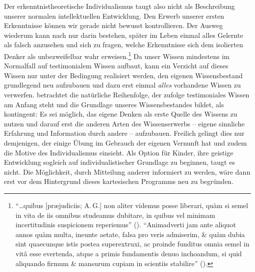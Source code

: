 Der erkenntnistheoretische Individualismus taugt also nicht als Beschreibung
unserer normalen intellektuellen Entwicklung. Den Erwerb unserer ersten
Erkenntnisse können wir gerade nicht bewusst kontrollieren. Der Ausweg wiederum
kann nach  nur darin bestehen, später im Leben einmal alles
Gelernte als falsch anzusehen und sich zu fragen, welche Erkenntnisse sich dem
isolierten Denker als unbezweifelbar wahr
erweisen.\footnote{\enquote{\dots\unkern quibus [pr{\ae}judiciis; A.\,G.] non
aliter videmus posse liberari, qu{\`a}m si semel in vita de iis omnibus
studeamus dubitare, in quibus vel minimam incertitudinis suspicionem reperiemus}
\mkbibparens{\cite[][VIII: 5.8--11]{Descartes:OeuvresdeDescartes1983}}.
\enquote{Animadverti jam ante aliquot annos qu{\`a}m multa, ineunte aetate, falsa pro veris admiserim, {\&}
qu{\`a}m dubia sint quaecunque istis postea superextruxi, ac proinde funditus
omnia semel in vit{\^a} esse evertenda, atque a primis fundamentis denuo
inchoandum, si quid aliquando firmum {\&} mansurum cupiam in scientiis
stabilire} \mkbibparens{\cite[][VII: 17.2--8]{Descartes:OeuvresdeDescartes1983}}.} Da
unser Wissen mindestens im Normalfall auf testimonialem Wissen
aufbaut, kann ein Verzicht auf dieses Wissen nur unter der Bedingung realisiert
werden, den eigenen Wissensbestand grundlegend neu aufzubauen und dazu erst
einmal \emph{alles} vorhandene Wissen zu verwerfen.  betrachtet
die natürliche Reihenfolge, der zufolge testimoniales Wissen am Anfang steht und die Grundlage
unseres Wissensbestandes bildet, als kontingent: Es sei
möglich, das eigene Denken als erste Quelle des Wissens zu nutzen und darauf
erst die anderen Arten des Wissenserwerbs -- eigene sinnliche Erfahrung und Information
durch andere -- aufzubauen. Freilich gelingt dies nur demjenigen, der einige
Übung im Gebrauch der eigenen Vernunft hat und zudem die Motive des
Individualismus einsieht. Als Option für Kinder, ihre geistige Entwicklung
sogleich auf individualistischer Grundlage zu beginnen, taugt es nicht.
Die Möglichkeit, durch Mitteilung anderer informiert zu werden, wäre dann erst
vor dem Hintergrund dieses kartesischen Programms neu zu begründen.


